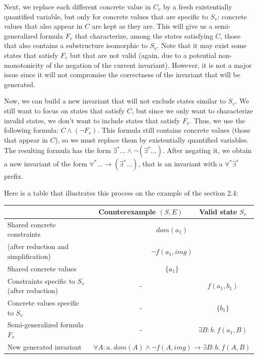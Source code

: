 \documentclass[11pt,a4paper,oldfontcommands,openany]{memoir}
\begin{document}
    Next, we replace each different concrete value in \(C_v\) by a fresh existentially quantified variable, but only for concrete values that are specific to \(S_v\):
    concrete values that also appear in \(C\) are kept as they are.
    This will give us a semi-generalized formula \(F_v\) that characterize, among the states satisfying \(C\), those that also
    contains a substructure isomorphic to \(S_v\). Note that it may exist some states that satisfy \(F_v\) but that are not
    valid (again, due to a potential non-monotonicity of the negation of the current invariant).
    However, it is not a major issue since it will not compromise the correctness of the invariant that will be generated.

    Now, we can build a new invariant that will not exclude states similar to \(S_v\).
    We still want to focus on states that satisfy \(C\), but since we only want to characterize invalid states, we don't want to include states that satisfy \(F_v\).
    Thus, we use the following formula: \( C \land (\neg F_v) \).
    This formula still contains concrete values (those that appear in \(C\)), so we must replace them by existentially quantified variables.
    The resulting formula has the form \( \exists^* \ldots \land \neg(\exists^* \ldots) \). After negating it, we obtain a new invariant of the form
    \( \forall^* \ldots \rightarrow (\exists^* \ldots) \), that is an invariant with a \(\forall^*\exists^*\) prefix.

    Here is a table that illustrates this process on the example of the section 2.4:\\
    \begin{tabular}{|l|c|c|}
        \hline
        & Counterexample \((S,E)\) & Valid state \(S_v\) \\
        \hline
        Shared concrete constraints & \multicolumn{2}{c|}{\(dom(a_1)\)}\\
        (after reduction and simplification) & \multicolumn{2}{c|}{\(\neg f(a_1,img)\)}\\
        \hline
        Shared concrete values & \multicolumn{2}{c|}{\(\{ a_1 \}\)} \\
        \hline
        Constraints specific to \(S_v\) (after reduction) & - & \(f(a_1,b_1)\) \\
        \hline
        Concrete values specific to \(S_v\) & - & \(\{b_1\}\) \\
        \hline
        Semi-generalized formula \(F_v\) & - & \(\exists B:b.\ f(a_1, B)\) \\
        \hline
        New generated invariant & \multicolumn{2}{c|}{\(\forall A:a.\ dom(A) \land \neg f(A,img) \rightarrow \exists B:b.\ f(A,B) \)}\\
        \hline
    \end{tabular}\\
\end{document}
